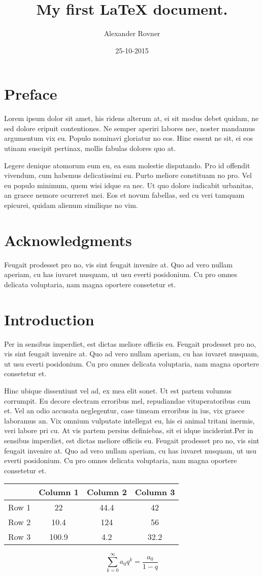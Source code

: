 \documentclass{article}
\title{My first LaTeX document.}
\date{25-10-2015}
\author{Alexander Rovner}
\begin{document}
\maketitle
\tableofcontents

\newpage
\section{Preface}
Lorem ipsum dolor sit amet, his ridens alterum at, ei sit modus debet quidam, ne sed dolore eripuit contentiones. Ne semper aperiri labores nec, noster mandamus argumentum vix eu. Populo nominavi gloriatur no eos. Hinc essent ne sit, ei eos utinam suscipit pertinax, mollis fabulas dolores quo at.

Legere denique atomorum eum eu, ea eam molestie disputando. Pro id offendit vivendum, cum habemus delicatissimi eu. Purto meliore constituam no pro. Vel eu populo minimum, quem wisi idque ea nec. Ut quo dolore iudicabit urbanitas, an graece nemore ocurreret mei. Eos et novum fabellas, sed cu veri tamquam epicurei, quidam alienum similique no vim.

\section*{Acknowledgments}
Feugait prodesset pro no, vis sint feugait invenire at. Quo ad vero nullam aperiam, cu has iuvaret nusquam, ut usu everti posidonium. Cu pro omnes delicata voluptaria, nam magna oportere consetetur et.

\section{Introduction}
Per in sensibus imperdiet, est dictas meliore officiis eu. Feugait prodesset pro no, vis sint feugait invenire at. Quo ad vero nullam aperiam, cu has iuvaret nusquam, ut usu everti posidonium. Cu pro omnes delicata voluptaria, nam magna oportere consetetur et.

Hinc ubique dissentiunt vel ad, ex mea elit sonet. Ut est partem volumus corrumpit. Eu decore electram erroribus mel, repudiandae vituperatoribus cum et. Vel an odio accusata neglegentur, case timeam erroribus in ius, vix graece laboramus an. Vix omnium vulputate intellegat eu, his ei animal tritani inermis, veri labore pri cu. At vis partem persius definiebas, sit ei idque inciderint.Per in sensibus imperdiet, est dictas meliore officiis eu. Feugait prodesset pro no, vis sint feugait invenire at. Quo ad vero nullam aperiam, cu has iuvaret nusquam, ut usu everti posidonium. Cu pro omnes delicata voluptaria, nam magna oportere consetetur et.

\begin{center}
\begin{tabular}{ | c | c | c | c |}
\hline
 & Column 1 & Column 2 & Column 3 \\ \hline
Row 1 & 22 & 44.4 & 42 \\ \hline
Row 2 & 10.4 & 124 & 56 \\ \hline
Row 3 & 100.9 & 4.2 & 32.2 \\
\end{tabular}
\end{center}


$$\sum_{k=0}^{\infty} a_0q^k = \frac{a_0}{1-q}$$
\end{document}
